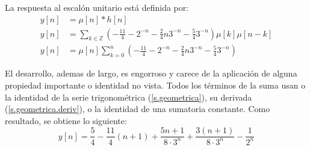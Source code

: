 \documentclass[a4paper,12pt]{report}
\begin{document}
\begin{enumerate}[label=\alph*), left=0pt]
    La respuesta al escalón unitario está definida por:
    \begin{align*}
      y[n] &= \mu[n] * h[n]\\[6pt]
      y[n] &= \sum_{k \in \mathbb{Z}} \left(-\frac{11}{4} - 2^{-n} - \frac{2}{4} n 3^{-n} - \frac{5}{4} 3^{-n}\right) \mu[k] \mu[n-k]\\
      y[n] &= \mu[n] \sum_{k=0}^n \left(-\frac{11}{4} - 2^{-n} - \frac{2}{4} n 3^{-n} - \frac{5}{4} 3^{-n}\right)
    \end{align*}


    El desarrollo, ademas de largo, es engorroso y carece de la aplicación de alguna propiedad importante o identidad
    no vista. Todos los términos de la suma usan o la identidad de la serie trigonométrica (\ref{s.geometrica}), su
    derivada (\ref{s.geometrica.deriv}), o la identidad de una sumatoria constante. Como resultado, se obtiene lo
    siguiente:
    \begin{equation*}
      y[n] = \frac{5}{4} - \frac{11}{4} (n+1) + \frac{5n + 1}{8 \cdot 3^n} + \frac{3 (n+1)}{8 \cdot 3^n} -
        \frac{1}{2^n}
    \end{equation*}


\end{enumerate}
\end{document}
